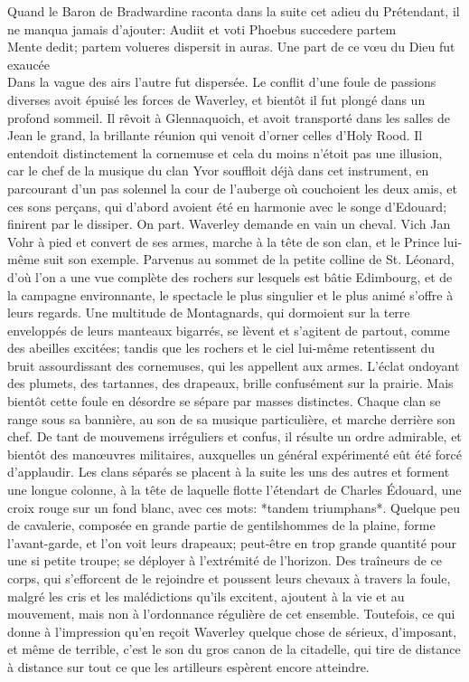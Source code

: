 {Quand le Baron de Bradwardine raconta dans la suite cet adieu du Prétendant, il ne manqua jamais d'ajouter:
\small{Audiit et voti Phoebus succedere partem\\Mente dedit; partem volueres dispersit in auras.}
\small{Une part de ce vœu du Dieu fut exaucée\\Dans la vague des airs l'autre fut dispersée.}
Le conflit d'une foule de passions diverses avoit épuisé les forces de Waverley, et bientôt il fut plongé dans un profond sommeil. Il rêvoit à Glennaquoich, et avoit transporté dans les salles de Jean le grand, la brillante réunion qui venoit d'orner celles d'Holy Rood. Il entendoit distinctement la cornemuse et cela du moins n'étoit pas une illusion, car le chef de la musique du clan Yvor souffloit déjà dans cet instrument, en parcourant d'un pas solennel la cour de l'auberge où couchoient les deux amis, et ces sons perçans, qui d'abord avoient été en\setcounter{page}{232} harmonie avec le songe d'Edouard; finirent par le dissiper. On part. Waverley demande en vain un cheval. Vich Jan Vohr à pied et convert de ses armes, marche à la tête de son clan, et le Prince lui-même suit son exemple. Parvenus au sommet de la petite colline de St. Léonard, d'où l'on a une vue complète des rochers sur lesquels est bâtie Edimbourg, et de la campagne environnante, le spectacle le plus singulier et le plus animé s'offre à leurs regards. Une multitude de Montagnards, qui dormoient sur la terre enveloppés de leurs manteaux bigarrés, se lèvent et s'agitent de partout, comme des abeilles excitées; tandis que les rochers et le ciel lui-même retentissent du bruit assourdissant des cornemuses, qui les appellent aux armes. L'éclat ondoyant des plumets, des tartannes, des drapeaux, brille confusément sur la prairie. Mais bientôt cette foule en désordre se sépare par masses distinctes. Chaque clan se range sous sa bannière, au son de sa musique particulière, et marche derrière son chef. De tant de mouvemens irréguliers et confus, il résulte un ordre admirable, et bientôt des manœuvres militaires, auxquelles un général expérimenté eût été forcé d'applaudir.\setcounter{page}{233} Les clans séparés se placent à la suite les uns des autres et forment une longue colonne, à la tête de laquelle flotte l'étendart de Charles Édouard, une croix rouge sur un fond blanc, avec ces mots: *tandem triumphans*. Quelque peu de cavalerie, composée en grande partie de gentilshommes de la plaine, forme l'avant-garde, et l'on voit leurs drapeaux; peut-être en trop grande quantité pour une si petite troupe; se déployer à l'extrémité de l'horizon. Des traîneurs de ce corps, qui s'efforcent de le rejoindre et poussent leurs chevaux à travers la foule, malgré les cris et les malédictions qu'ils excitent, ajoutent à la vie et au mouvement, mais non à l'ordonnance régulière de cet ensemble. Toutefois, ce qui donne à l'impression qu'en reçoit Waverley quelque chose de sérieux, d'imposant, et même de terrible, c'est le son du gros canon de la citadelle, qui tire de distance à distance sur tout ce que les artilleurs espèrent encore atteindre.
}
